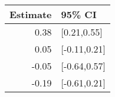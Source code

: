 \begin{tabular}{rl}
  \hline
Estimate & 95\% CI \\ 
  \hline
0.38 & [0.21,0.55] \\ 
  0.05 & [-0.11,0.21] \\ 
  -0.05 & [-0.64,0.57] \\ 
  -0.19 & [-0.61,0.21] \\ 
   \hline
\end{tabular}

